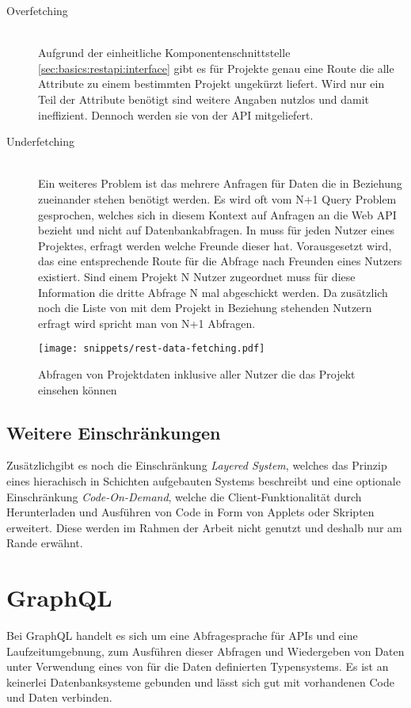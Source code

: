 \begin{description}
	\item[Overfetching\label{rest:overfetching}] \ \\
	Aufgrund der einheitliche Komponentenschnittstelle \ref{sec:basics:restapi:interface} gibt es für Projekte genau eine Route die alle Attribute zu einem bestimmten
	Projekt ungekürzt liefert. Wird nur ein Teil der Attribute benötigt sind weitere Angaben nutzlos und damit ineffizient.
	Dennoch werden sie von der API mitgeliefert.
	\item[Underfetching\label{rest:underfetching}] \ \\
	Ein weiteres Problem ist das mehrere Anfragen für Daten die in Beziehung zueinander stehen benötigt werden. Es wird oft vom N+1 Query Problem gesprochen, welches sich in diesem Kontext auf Anfragen an die Web API bezieht und nicht auf Datenbankabfragen.
	In  muss für jeden Nutzer eines Projektes, erfragt werden welche Freunde dieser hat. Vorausgesetzt wird, das eine entsprechende Route für die Abfrage nach Freunden eines Nutzers existiert.
	Sind einem Projekt N Nutzer zugeordnet muss für diese Information die dritte Abfrage N mal abgeschickt werden. Da zusätzlich noch die Liste von mit dem Projekt in Beziehung stehenden Nutzern erfragt wird spricht man von N+1 Abfragen.
\end{description}

\begin{figure}[h!]
	\centering
	\texttt{[image: snippets/rest-data-fetching.pdf]}
	\caption{Abfragen von Projektdaten inklusive aller Nutzer die das Projekt einsehen können}
	\label{basics:rest:data-fetching}
\end{figure}

\subsection{Weitere Einschränkungen}
Zusätzlichgibt es noch die Einschränkung \emph{Layered System}, welches das Prinzip eines hierachisch in Schichten aufgebauten Systems
beschreibt und eine optionale Einschränkung \emph{Code-On-Demand}, welche die Client-Funktionalität durch Herunterladen und Ausführen von Code in
Form von Applets oder Skripten erweitert. Diese werden im Rahmen der Arbeit nicht genutzt und deshalb nur am Rande erwähnt.

\section{GraphQL}
\label{sec:basics:graphql}
Bei GraphQL handelt es sich um eine Abfragesprache für APIs und eine Laufzeitumgebnung,
zum Ausführen dieser Abfragen und Wiedergeben von Daten unter Verwendung eines von für die Daten definierten Typensystems.
Es ist an keinerlei Datenbanksysteme gebunden und lässt sich gut mit vorhandenen Code und Daten verbinden.


